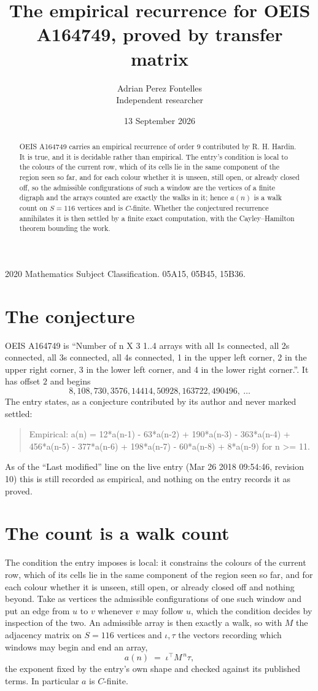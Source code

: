 \documentclass[11pt,a4paper]{article}
\title{The empirical recurrence for OEIS A164749, proved by transfer matrix}
\author{Adrian Perez Fontelles\\ \small Independent researcher}
\date{13 September 2026}
\theoremstyle{plain}
\theoremstyle{definition}
\begin{document}
\maketitle

\begin{abstract}
OEIS A164749 carries an empirical recurrence of order $9$ contributed by R. H. Hardin. It is
true, and it is decidable rather than empirical. The entry's condition is local to the colours of the current row, which of its cells lie in the same component of the region seen so far, and for each colour whether it is unseen, still open, or already closed off, so
the admissible configurations of such a window are the vertices of a finite digraph and the
arrays counted are exactly the walks in it; hence $a(n)$ is a walk count on $S=116$ vertices
and is $C$-finite. Whether the conjectured recurrence annihilates it is then settled by a
finite exact computation, with the Cayley--Hamilton theorem bounding the work.
\end{abstract}

\noindent\small 2020 Mathematics Subject Classification. 05A15, 05B45, 15B36.\normalsize

\section{The conjecture}

OEIS A164749 is ``Number of n X 3 1..4 arrays with all 1s connected, all 2s connected, all 3s connected, all 4s connected, 1 in the upper left corner, 2 in the upper right corner, 3 in the lower left corner, and 4 in the lower right corner.''. It has offset $2$ and begins
\[
8, 108, 730, 3576, 14414, 50928, 163722, 490496,\ \dots
\]
The entry states, as a conjecture contributed by its author and never marked settled:
\begin{quote}
Empirical: a(n) = 12*a(n-1) - 63*a(n-2) + 190*a(n-3) - 363*a(n-4) + 456*a(n-5) - 377*a(n-6) + 198*a(n-7) - 60*a(n-8) + 8*a(n-9) for n >= 11.
\end{quote}
As of the ``Last modified'' line on the live entry (Mar 26 2018 09:54:46, revision 10) this is still
recorded as empirical, and nothing on the entry records it as proved.

\section{The count is a walk count}

The condition the entry imposes is local: it constrains the colours of the current row, which of its cells lie in the same component of the region seen so far, and for each colour whether it is unseen, still open, or already closed off and nothing beyond. Take as
vertices the admissible configurations of one such window and put an edge from $u$ to $v$
whenever $v$ may follow $u$, which the condition decides by inspection of the two. An
admissible array is then exactly a walk, so with $M$ the adjacency matrix on $S=116$ vertices
and $\iota,\tau$ the vectors recording which windows may begin and end an array,
\[
a(n)\;=\;\iota^{\!\top}M^{\,n}\tau ,
\]
the exponent fixed by the entry's own shape and checked against its published terms. In
particular $a$ is $C$-finite.
\end{document}
